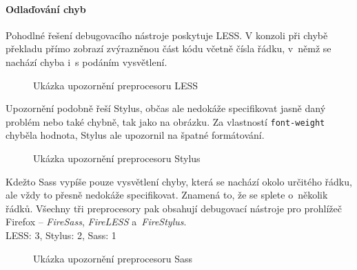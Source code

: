 \documentclass[thesis=B,czech]{FITthesis}[2012/06/26]
\begin{document}
\paragraph{Odlaďování chyb}

Pohodlné řešení debugovacího nástroje poskytuje LESS. V konzoli při chybě překladu přímo zobrazí zvýrazněnou část kódu včetně čísla řádku, v~němž se nachází chyba i~s podáním vysvětlení. 

\begin{figure}[htb]
	\begin{center}
	\end{center}
	\caption{Ukázka upozornění preprocesoru LESS}
	\label{imgLESS1}
\end{figure}
Upozornění podobně řeší Stylus, občas ale nedokáže specifikovat jasně daný problém nebo také chybně, tak jako na obrázku. Za vlastností \verb#font-weight# chyběla hodnota, Stylus ale upozornil na špatné formátování.
\begin{figure}[h]
	\begin{center}
	\end{center}
	\caption{Ukázka upozornění preprocesoru Stylus}
	\label{imgSass1}
\end{figure}

Kdežto Sass vypíše pouze vysvětlení chyby, která se nachází okolo určitého řádku, ale vždy to přesně nedokáže specifikovat. Znamená to, že se splete o~několik řádků. Všechny tři preprocesory pak obsahují debugovací nástroje pro prohlížeč Firefox -- \textit{FireSass}, \textit{FireLESS} a~\textit{FireStylus}.\\
LESS: 3, Stylus: 2, Sass: 1

\begin{figure}[h]
	\begin{center}
	\end{center}
	\caption{Ukázka upozornění preprocesoru Sass}
	\label{imgStyl1}
\end{figure}
\end{document}
